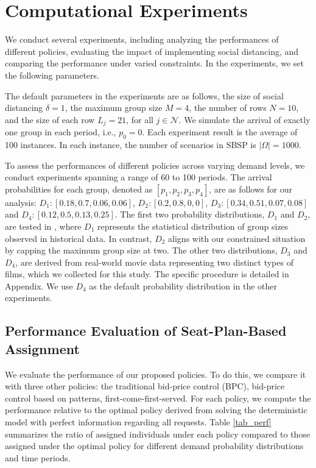 \section{Computational Experiments}\label{sec_result}
We conduct several experiments, including analyzing the performances of different policies, evaluating the impact of implementing social distancing, and comparing the performance under varied constraints.
In the experiments, we set the following parameters. 

The default parameters in the experiments are as follows, the size of social distancing $\delta =1$, the maximum group size $M =4$, the number of rows $N = 10$, and the size of each row $L_j = 21$, for all $j \in \mathcal{N}$. We simulate the arrival of exactly one group in each period, i.e., $p_0 = 0$. Each experiment result is the average of 100 instances. In each instance, the number of scenarios in SBSP is $|\Omega| = 1000$.

To assess the performances of different policies across varying demand levels, we conduct experiments spanning a range of 60 to 100 periods. The arrival probabilities for each group, denoted as $[p_1,p_2,p_3,p_4]$, are as follows for our analysis: $D_1:[0.18,0.7,0.06,0.06]$, $D_2:[0.2,0.8,0,0]$, $D_3: [0.34, 0.51, 0.07, 0.08]$ and $D_4: [0.12, 0.5, 0.13, 0.25]$. The first two probability distributions, $D_1$ and $D_2$, are tested in \cite{blom2022filling}, where $D_1$ represents the statistical distribution of group sizes observed in historical data. In contrast, $D_2$ aligns with our constrained situation by capping the maximum group size at two. The other two distributions, $D_3$ and $D_4$, are derived from real-world movie data representing two distinct types of films, which we collected for this study. The specific procedure is detailed in Appendix. We use $D_4$ as the default probability distribution in the other experiments.


\subsection{Performance Evaluation of Seat-Plan-Based Assignment}
We evaluate the performance of our proposed policies. To do this, we compare it with three other policies: the traditional bid-price control (BPC), bid-price control based on patterns, first-come-first-served. For each policy, we compute the performance relative to the optimal policy derived from solving the deterministic model with perfect information regarding all requests. Table \ref{tab_perf} summarizes the ratio of assigned individuals under each policy compared to those assigned under the optimal policy for different demand probability distributions and time periods. 


